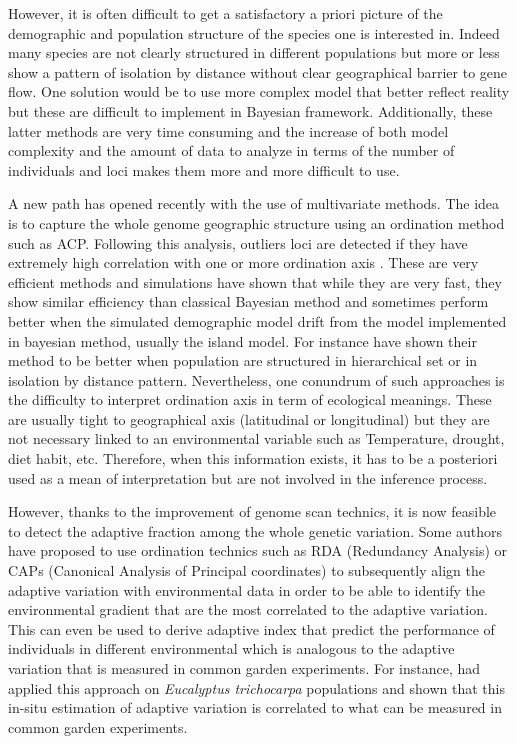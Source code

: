 \documentclass[a4paper,times,10pt,authoryear]{article}%
\begin{document}
However, it is often difficult to get a satisfactory a priori picture of the demographic and population structure of the species one is interested in. Indeed many species are not clearly structured in different populations but more or less show a pattern of isolation by distance without clear geographical barrier to gene flow. One solution would be to use more complex model that better reflect reality but these are difficult to implement in Bayesian framework. Additionally, these latter methods are very time consuming and the increase of both model complexity and the amount of data to analyze in terms of the number of individuals and loci makes them more and more difficult to use.

A new path has opened recently with the use of multivariate methods. The idea is to capture the whole genome geographic structure using an ordination method such as ACP. Following this analysis, outliers loci are detected if they have extremely high correlation with one or more ordination axis \citep{Duforet-Frebourg2014a,Luu2016}.  These are very efficient methods and simulations have shown that while they are very fast, they show similar efficiency than classical Bayesian method and sometimes perform better when the simulated demographic model drift from the model implemented in bayesian method, usually the island model. For instance \citet{Luu2016} have shown their method to be better when population are structured in hierarchical set or in isolation by distance pattern. Nevertheless, one conundrum of such approaches is the difficulty to interpret ordination axis in term of ecological meanings. These are usually tight to geographical axis (latitudinal or longitudinal) but they are not necessary linked to an environmental variable such as Temperature, drought, diet habit, etc. Therefore, when this information exists, it has to be a posteriori used as a mean of interpretation but are not involved in the inference process.

However, thanks to the improvement of genome scan technics, it is now feasible to detect the adaptive fraction among the whole genetic variation. Some authors \citep{DeKort2014,Steane2014a} have proposed to use ordination technics such as RDA (Redundancy Analysis) or CAPs (Canonical Analysis of Principal coordinates) to subsequently align the adaptive variation with environmental data in order to be able to identify the environmental gradient that are the most correlated to the adaptive variation. This can even be used to derive adaptive index that predict the performance of individuals in different environmental which is analogous to the adaptive variation that is measured in common garden experiments. For instance, \citet{Steane2014a} had applied this approach on \textit{Eucalyptus trichocarpa} populations and shown that this {in-situ} estimation of adaptive variation is correlated to what can be measured in common garden experiments.
\end{document}
